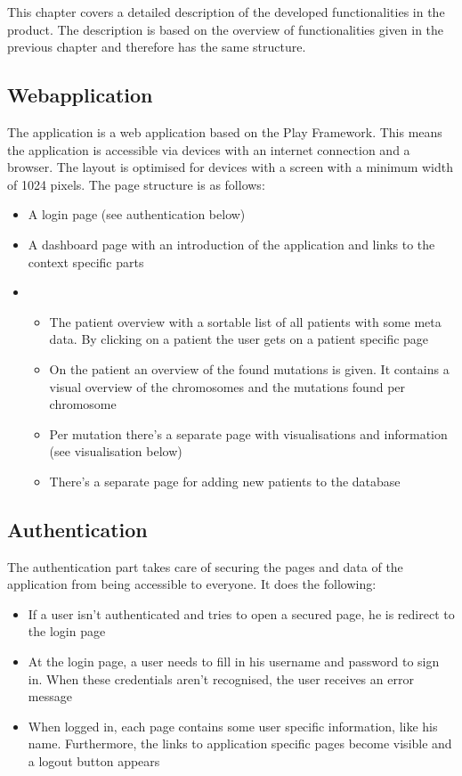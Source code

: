 This chapter covers a detailed description of the developed functionalities in the product. The description is based  on the overview of functionalities given in the previous chapter and therefore has the same structure.

\subsection{Webapplication}

The application is a web application based on the Play Framework. This means the application is accessible via devices with an internet connection and a browser. The layout is optimised for devices with a screen with a minimum width of 1024 pixels. The page structure is as follows:

\begin{itemize}
  \item A login page (see authentication below)
  \item A dashboard page with an introduction of the application and links to the context specific parts
  \item
  \begin{itemize}
     \item The patient overview with a sortable list of all patients with some meta data. By clicking on a patient the user gets on a patient specific page
     \item On the patient an overview of the found mutations is given. It contains a visual overview of the chromosomes and the mutations found per chromosome
     \item Per mutation there's a separate page with visualisations and information (see visualisation below)
     \item There's a separate page for adding new patients to the database
  \end{itemize}
\end{itemize}

\subsection{Authentication}

The authentication part takes care of securing the pages and data of the application from being accessible to everyone. It does the following:

\begin{itemize}
  \item If a user isn't authenticated and tries to open a secured page, he is redirect to the login page
  \item At the login page, a user needs to fill in his username and password to sign in. When these credentials aren't recognised, the user receives an error message
  \item When logged in, each page contains some user specific information, like his name. Furthermore, the links to application specific pages become visible and a logout button appears
\end{itemize}

